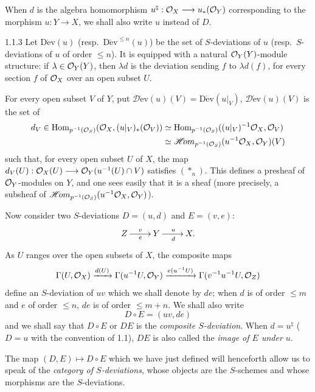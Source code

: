 When $d$ is the algebra homomorphism $u^\natural:\mathcal{O}_X\longrightarrow u_*(\mathcal{O}_Y)$ corresponding to the morphism $u:Y\to X$, we shall also write $u$ instead of $D$.

\begin{remarks}{1.1.3}\label{VIIA.1.1.3}
Let $\operatorname{D\acute ev}(u)$ (resp.\ $\operatorname{D\acute ev}^{\leq n}(u)$) be the set of $S$-deviations of $u$ (resp.\ $S$-deviations of $u$ of order $\leq n$). It is equipped with a natural $\mathcal{O}_Y(Y)$-module structure: if $\lambda\in\mathcal{O}_Y(Y)$, then $\lambda d$ is the deviation sending $f$ to $\lambda d(f)$, for every section $f$ of $\mathcal{O}_X$ over an open subset $U$.

For every open subset $V$ of $Y$, put $\mathscr{D}\!\operatorname{\acute ev}(u)(V)=\operatorname{D\acute ev}(u|_V)$, \ie $\mathscr{D}\!\operatorname{\acute ev}(u)(V)$ is the set of
\[
\begin{aligned}
d_V\in\operatorname{Hom}_{p^{-1}(\mathcal{O}_S)}(\mathcal{O}_X,(u|_V)_*(\mathcal{O}_V))
&\simeq\operatorname{Hom}_{p^{-1}(\mathcal{O}_S)}((u|_V)^{-1}\mathcal{O}_X,\mathcal{O}_V)\\
&\simeq\mathscr{H}\!om_{p^{-1}(\mathcal{O}_S)}(u^{-1}\mathcal{O}_X,\mathcal{O}_Y)(V)
\end{aligned}
\]
such that, for every open subset $U$ of $X$, the map $d_V(U):\mathcal{O}_X(U)\longrightarrow\mathcal{O}_Y(u^{-1}(U)\cap V)$ satisfies $(*_n)$. This defines a presheaf of $\mathcal{O}_Y$-modules on $Y$, and one sees easily that it is a sheaf (more precisely, a subsheaf of $\mathscr{H}\!om_{p^{-1}(\mathcal{O}_S)}(u^{-1}\mathcal{O}_X,\mathcal{O}_Y)$).
\end{remarks}

Now consider two $S$-deviations $D=(u,d)$ and $E=(v,e)$:
\[
\xymatrix{Z\ar[r]^{v}_{e}&Y\ar[r]^{u}_{d}&X.}
\]
As $U$ ranges over the open subsets of $X$, the composite maps
\[
\Gamma(U,\mathcal{O}_X)\xrightarrow{d(U)}\Gamma(u^{-1}U,\mathcal{O}_Y)\xrightarrow{e(u^{-1}U)}\Gamma(v^{-1}u^{-1}U,\mathcal{O}_Z)
\]
define an $S$-deviation of $uv$ which we shall denote by $de$; when $d$ is of order $\leq m$ and $e$ of order $\leq n$, $de$ is of order $\leq m+n$. We shall also write
\begin{equation}\tag{$\dagger$}D\circ E=(uv,de)\end{equation}
and we shall say that $D\circ E$ or $DE$ is the \emph{composite $S$-deviation}. When $d=u^\natural$ (\ie $D=u$ with the convention of 1.1), $DE$ is also called the \emph{image of $E$ under $u$}.

The map $(D,E)\mapsto D\circ E$ which we have just defined will henceforth allow us to speak of the \emph{category of $S$-deviations}, whose objects are the $S$-schemes and whose morphisms are the $S$-deviations.

